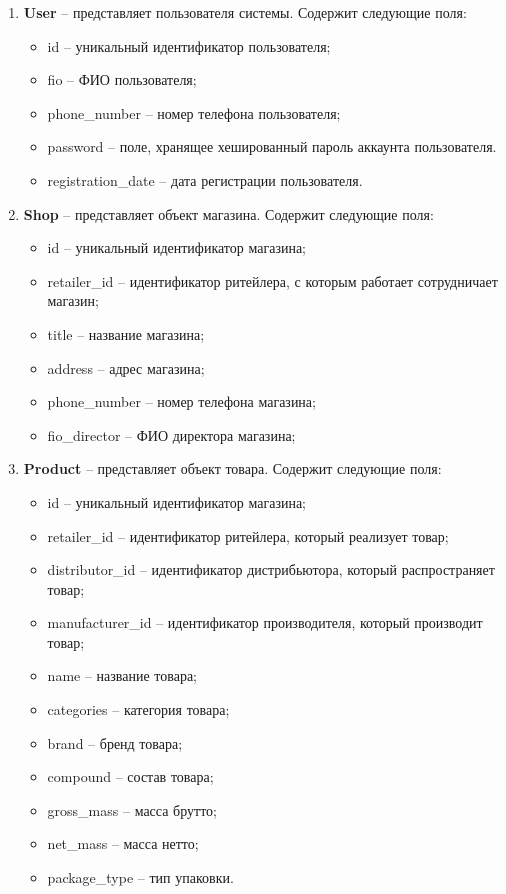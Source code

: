 \begin{enumerate}
	\item \textbf{User} -- представляет пользователя системы. Содержит следующие поля: 
	\begin{itemize}
		\item id -- уникальный идентификатор пользователя;
		\item fio -- ФИО пользователя;
		\item phone\_number -- номер телефона пользователя;
		\item password -- поле, хранящее хешированный пароль аккаунта пользователя.
		\item registration\_date -- дата  регистрации пользователя.
	\end{itemize}
	
	\item \textbf{Shop} -- представляет объект магазина. Содержит следующие поля: 
	\begin{itemize}
		\item id -- уникальный идентификатор магазина;
		\item retailer\_id -- идентификатор ритейлера, с которым работает сотрудничает магазин;
		\item title -- название магазина;
		\item address -- адрес магазина;
		\item phone\_number -- номер телефона магазина;
		\item fio\_director -- ФИО директора магазина;
	\end{itemize}
	
	\item \textbf{Product} -- представляет объект товара. Содержит следующие поля: 
	\begin{itemize}
		\item id -- уникальный идентификатор магазина;
		\item retailer\_id -- идентификатор ритейлера, который реализует товар;
		\item distributor\_id -- идентификатор дистрибьютора, который распространяет товар;
		\item manufacturer\_id -- идентификатор производителя, который производит товар;
		\item name -- название товара;
		\item categories -- категория товара;
		\item brand -- бренд товара;
		\item compound -- состав товара;
		\item gross\_mass -- масса брутто;
		\item net\_mass -- масса нетто;
		\item package\_type -- тип упаковки.
	\end{itemize}
	

\end{enumerate}

